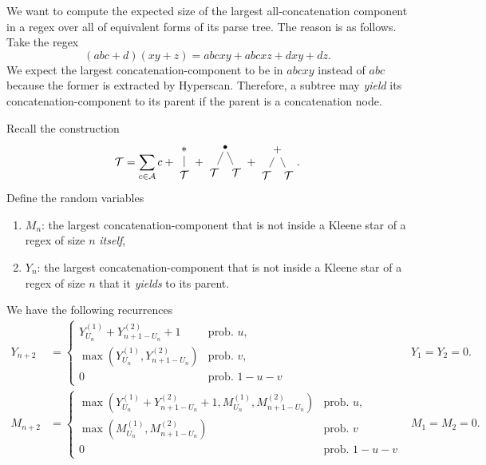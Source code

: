 We want to compute the expected size of the largest all-concatenation component in a regex over all of equivalent forms of its parse tree. The reason is as follows. Take the regex
$$(abc + d)(xy+z) = abcxy + abcxz + dxy + dz.$$
We expect the largest concatenation-component to be in $abcxy$ instead of $abc$ because the former is extracted by Hyperscan. Therefore, a subtree may \textit{yield} its concatenation-component to its parent if the parent is a concatenation node.

Recall the construction
$$\T = \sum_{c \in \A} c + \vcenter{\hbox{\begin{tikzpicture}[level distance=8mm, sibling distance=7mm]
        \node{$*$}
        child { node {$\T$} };
      \end{tikzpicture}}} + \vcenter{\hbox{\begin{tikzpicture}[level distance=8mm, sibling distance=7mm, edge from parent/.style={draw, shorten <=1mm}]
        \node[circle, draw, fill=black, minimum size=1mm, inner sep=0pt] {}
        child { node {$\T$} }
        child { node {$\T$} };
      \end{tikzpicture}}} + \vcenter{\hbox{\begin{tikzpicture}[level distance=8mm, sibling distance=7mm]
        \node{$+$}
        child { node {$\T$} }
        child { node {$\T$} };
      \end{tikzpicture}}}.$$
Define the random variables
\begin{enumerate}
  \item $M_n$: the largest concatenation-component that is not inside a Kleene star of a regex of size $n$ \textit{itself},
  \item $Y_n$: the largest concatenation-component that is not inside a Kleene star of a regex of size $n$ that it \textit{yields} to its parent.
\end{enumerate}

We have the following recurrences
\begin{align}
  Y_{n+2}
   & =\begin{cases}
        Y_{U_n}^{(1)} + Y_{n+1-U_n}^{(2)} + 1  & \text{prob. } u,    \\
        \max(Y_{U_n}^{(1)}, Y_{n+1-U_n}^{(2)}) & \text{prob. } v,    \\
        0                                      & \text{prob. } 1-u-v
      \end{cases}                                                                      & Y_1=Y_2=0.                         \label{eq:yield}                           \\
  M_{n+2}
   & = \begin{cases}
         \max(Y_{U_n}^{(1)} + Y_{n+1-U_n}^{(2)} + 1, M_{U_n}^{(1)}, M_{n+1-U_n}^{(2)}) & \text{prob. } u,    \\
         \max(M_{U_n}^{(1)}, M_{n+1-U_n}^{(2)})                                        & \text{prob. } v     \\
         0                                                                             & \text{prob. } 1-u-v
       \end{cases} & M_1=M_2=0.
\end{align}

